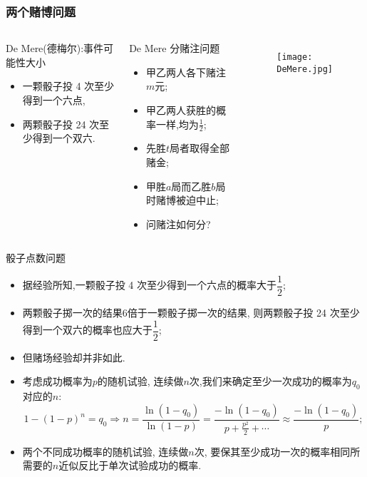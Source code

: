 \begin{frame}
  \frametitle{ 两个赌博问题}
  \begin{columns}
    \column{7.5cm}
    \begin{prob}De Mere(德梅尔):事件可能性大小
      \begin{itemize}[<+-|alert@+>]
      \item 一颗骰子投 4 次至少得到一个六点,
      \item 两颗骰子投 24 次至少得到一个双六.
      \end{itemize}
    \end{prob}
    \pause
    \begin{prob}  {\rm De Mere} 分赌注问题
      \begin{itemize}[<+-|alert@+>]
      \item 甲乙两人各下赌注$m$元;
      \item 甲乙两人获胜的概率一样,均为$\frac{1}{2}$;
      \item 先胜$t$局者取得全部赌金;
      \item 甲胜$a$局而乙胜$b$局时赌博被迫中止;
      \item 问赌注如何分?
      \end{itemize}
    \end{prob}
    \column{4cm}
    \vspace{-0.5cm}
    \begin{figure}[htbp]\nonumber


      \centering
      \texttt{[image: DeMere.jpg]}
      \vspace{0cm}



    \end{figure}
  \end{columns}
\end{frame}
\begin{frame}{骰子点数问题}
\begin{itemize}[<+-|alert@+>]
	\item 据经验所知,一颗骰子投 4 次至少得到一个六点的概率大于$\dfrac{1}{2}$;
	\item 两颗骰子掷一次的结果6倍于一颗骰子掷一次的结果, 则两颗骰子投 24 次至少得到一个双六的概率也应大于$\dfrac{1}{2}$;
	\item 但赌场经验却并非如此.%
	\item 考虑成功概率为$p$的随机试验, 连续做$n$次,我们来确定至少一次成功的概率为$q_0$对应的$n$:
	\[1-(1-p)^n=q_0\Rightarrow n=\dfrac{\ln(1-q_0)}{\ln(1-p)}=\dfrac{-\ln(1-q_0)}{p+\frac{p^2}{2}+\cdots}\approx \dfrac{-\ln(1-q_0)}{p};\]
	\item 两个不同成功概率的随机试验, 连续做$n$次, 要保其至少成功一次的概率相同所需要的$n$近似反比于单次试验成功的概率.
\end{itemize}


\end{frame}




